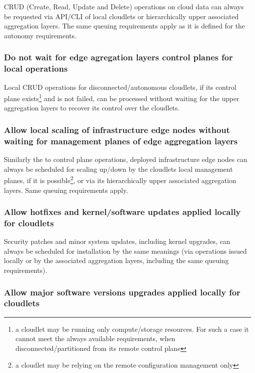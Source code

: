 \documentclass[conference]{IEEEtran}
\begin{document}
CRUD (Create, Read, Update and Delete) operations on cloud data can always be
requested via API/CLI of local cloudlets or hierarchically upper associated
aggregation layers. The same queuing requirements apply as it is defined for
the autonomy requirements.

\subsubsection{Do not wait for edge agregation layers control planes for local
operations}

Local CRUD operations for disconnected/autonomous cloudlets,
if its control plane exists\footnote{a cloudlet may be running only
compute/storage resources. For such a case it cannot meet the always available
requirements, when disconnected/partitioned from its remote control plane} and
is not failed, can be processed without waiting for the upper aggregation
layers to recover its control over the cloudlets.

\subsubsection{Allow local scaling of infrastructure edge nodes without waiting
for management planes of edge aggregation layers}

Similarly the to control plane operations, deployed infrastructure edge nodes
can always be scheduled for scaling up/down by the cloudlets local management
planes, if it is possible\footnote{a cloudlet may be relying on the remote
configuration management only}, or via its hierarchically upper associated
aggregation layers. Same queuing requirements apply.

\subsubsection{Allow hotfixes and kernel/software updates applied locally for
cloudlets}

Security patches and minor system updates, including kernel upgrades, can
always be scheduled for installation by the same meanings (via operations
issued locally or by the associated aggregation layers, including the same
queuing requirements).

\subsubsection{Allow major software versions upgrades applied locally for
cloudlets}
\end{document}
